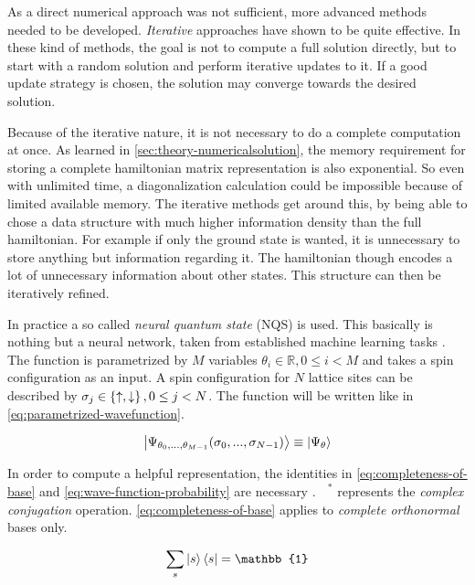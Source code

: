 As a direct numerical approach was not sufficient, more advanced methods needed to be developed. 
\emph{Iterative} approaches have shown to be quite effective. 
In these kind of methods, the goal is not to compute a full solution directly, but to start with a random solution and perform iterative updates to it. 
If a good update strategy is chosen, the solution may converge towards the desired solution.

Because of the iterative nature, it is not necessary to do a complete computation at once. 
As learned in \autoref{sec:theory-numericalsolution}, the memory requirement for storing a complete hamiltonian matrix representation is also exponential.
So even with unlimited time, a diagonalization calculation could be impossible because of limited available memory. 
The iterative methods get around this, by being able to chose a data structure with much higher information density than the full hamiltonian. For example if only the ground state is wanted, it is unnecessary to store anything but information regarding it. The hamiltonian though encodes a lot of \glqq unnecessary\grqq{} information about other states. This structure can then be iteratively refined.

In practice a so called \emph{neural quantum state} (NQS) is used. 
This basically is nothing but a neural network, taken from established machine learning tasks \cite{restrictedBoltzmanMachines}.
The function is parametrized by $M$ variables $\theta_i \in \mathbb{R}, 0\leq i < M$ and takes a spin configuration as an input.
A spin configuration for $N$ lattice sites can be described by $\sigma_j \in \left\{\uparrow, \downarrow\right\}, 0\leq j < N$.
The function will be written like in \autoref{eq:parametrized-wavefunction}.

\begin{equation}
    \label{eq:parametrized-wavefunction}
    \ket{\Psi_{\theta_0, ..., \theta_{M-1}}(\sigma_0, ..., \sigma_{N-1})} \equiv \ket{\Psi_\theta}
\end{equation}

In order to compute a helpful representation, the identities in \autoref{eq:completeness-of-base} and \autoref{eq:wave-function-probability} are necessary \cite{schwablQM}. \hspace{-0.13cm}$\phantom{\Psi}^\ast$ represents the \emph{complex conjugation} operation. \autoref{eq:completeness-of-base} applies to \emph{complete orthonormal} bases only.

\begin{equation}
    \label{eq:completeness-of-base}
    \sum\limits_{s} \ket{s}\bra{s} = \mathbb{1}
\end{equation}

